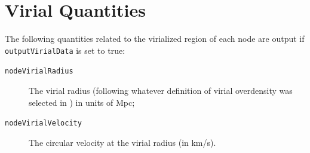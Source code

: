 \section{Virial Quantities}

The following quantities related to the virialized region of each node are output if {\tt outputVirialData} is set to true:
\begin{description}
 \item [{\tt nodeVirialRadius}] The virial radius (following whatever definition of virial overdensity was selected in \glc) in units of Mpc;
 \item [{\tt nodeVirialVelocity}] The circular velocity at the virial radius (in km/s).
\end{description}
